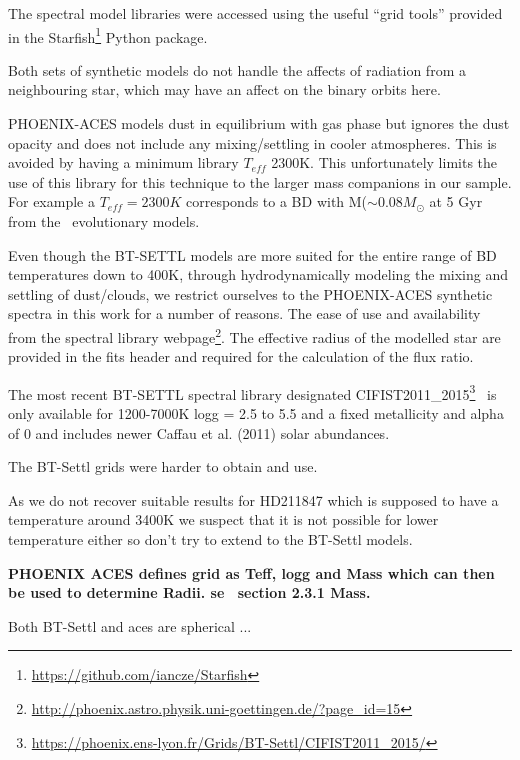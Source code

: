 The spectral model libraries were accessed using the useful ``grid tools'' provided in the Starfish\footnote{\url{https://github.com/iancze/Starfish}} Python package\citep{czekala_constructing_2015}.


Both sets of synthetic models do not handle the affects of radiation from a neighbouring star, which may have an affect on the binary orbits here.



PHOENIX-ACES models dust in equilibrium with gas phase but ignores the dust opacity and does not include any mixing/settling in cooler atmospheres. This is avoided by having a minimum library \(T_{eff}\) 2300K. This unfortunately limits the use of this library for this technique to the larger mass companions in our sample. For example a \(T_{eff}=2300K\) corresponds to a BD with M(\(\sim0.08 M_{\odot}\) at 5 Gyr from the~\citet{baraffe_evolutionary_2003} evolutionary models.


Even though the BT-SETTL models are more suited for the entire range of BD temperatures down to 400K, through hydrodynamically modeling the mixing and settling of dust/clouds, we restrict ourselves to the PHOENIX-ACES synthetic spectra in this work for a number of reasons. The ease of use and availability from the spectral library webpage\footnote{\url{http://phoenix.astro.physik.uni-goettingen.de/?page_id=15}}. The effective radius of the modelled star are provided in the fits header and required for the calculation of the flux ratio.



The most recent BT-SETTL spectral library designated CIFIST2011\_2015\footnote{\url{https://phoenix.ens-lyon.fr/Grids/BT-Settl/CIFIST2011_2015/}}~\citep{baraffe_new_2015} is only available for 1200-7000K logg = 2.5 to 5.5 and a fixed metallicity and alpha of 0 and includes newer Caffau et al. (2011) solar abundances.

The BT-Settl grids were harder to obtain and use.

As we do not recover suitable results for HD211847 which is supposed to have a temperature around 3400K we suspect that it is not possible for lower temperature either so don't try to extend to the BT-Settl models.


\textbf{
    PHOENIX ACES defines grid as Teff, logg and Mass which can then be used to determine Radii. se~\citep{husser_new_2013} section 2.3.1 Mass.}

Both BT-Settl and aces are spherical
...




